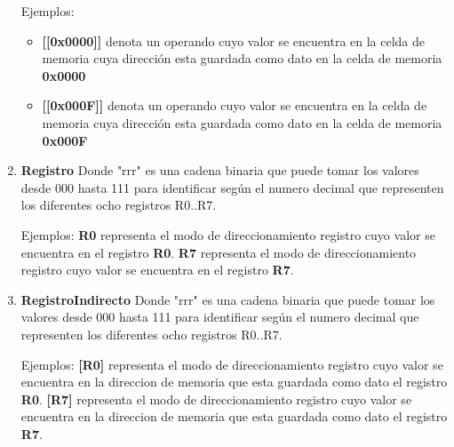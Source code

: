 \begin{enumerate}
Ejemplos:
\begin{itemize}
\item \textbf{[[0x0000]]} denota  {un operando} cuyo valor se encuentra en la celda de memoria cuya dirección esta guardada como dato en la celda de memoria  \textbf{0x0000}
\item \textbf{[[0x000F]]} denota  {un operando} cuyo valor se encuentra en la celda de memoria cuya dirección esta guardada como dato en la celda de memoria  \textbf{0x000F}
\end{itemize}

\item \textbf{Registro}
Donde "rrr" es una cadena binaria que puede tomar los valores desde 000 hasta 111 para identificar según el numero decimal que representen los diferentes ocho registros R0..R7.

Ejemplos:
\textbf{R0} representa el modo de direccionamiento registro cuyo valor se encuentra en el registro \textbf{R0}.
\textbf{R7} representa el modo de direccionamiento registro cuyo valor se encuentra en el registro \textbf{R7}.

\item \textbf{RegistroIndirecto}
Donde "rrr" es una cadena binaria que puede tomar los valores desde 000 hasta 111 para identificar según el numero decimal que representen los diferentes ocho registros R0..R7.

Ejemplos:
\textbf{[R0]} representa el modo de direccionamiento registro cuyo valor se encuentra en la direccion de memoria que esta guardada como dato el registro \textbf{R0}.
\textbf{[R7]} representa el modo de direccionamiento registro cuyo valor se encuentra en la direccion de memoria que esta guardada como dato el registro \textbf{R7}.

\end{enumerate}


